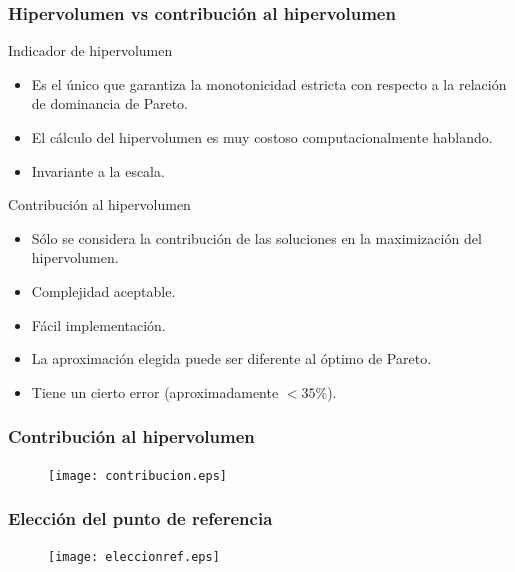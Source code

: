 \documentclass[10pt,compress]{beamer}
\begin{document}
\begin{frame}
	\frametitle{Hipervolumen vs contribuci\'on al hipervolumen}	
	\begin{block}{Indicador de hipervolumen}
		\begin{itemize}
		\item Es el \'unico que garantiza la monotonicidad estricta con respecto a la relaci\'on de dominancia de Pareto.
		\item El c\'alculo del hipervolumen es muy costoso computacionalmente hablando.	
		\item Invariante a la escala.		
		\end{itemize}
	\end{block}
	\begin{block}{Contribuci\'on al hipervolumen}
		\begin{itemize}
		\item S\'olo se considera la contribuci\'on de las soluciones en la maximizaci\'on del hipervolumen.
		\item Complejidad aceptable.
		\item F\'acil implementaci\'on.
		\item La aproximaci\'on elegida puede ser diferente al \'optimo de Pareto.
		\item Tiene un cierto error (aproximadamente $<35 \%$).
		\end{itemize}
	\end{block}
\end{frame}

\begin{frame}
	\frametitle{Contribuci\'on al hipervolumen}
   \begin{figure}
    \centering
    \texttt{[image: contribucion.eps]}
    
    \end{figure}
\end{frame}
\begin{frame}
	\frametitle{Elecci\'on del punto de referencia}
	   \begin{figure}
	\centering
	\texttt{[image: eleccionref.eps]}	  
      
      \end{figure}
\end{frame}
\end{document}

